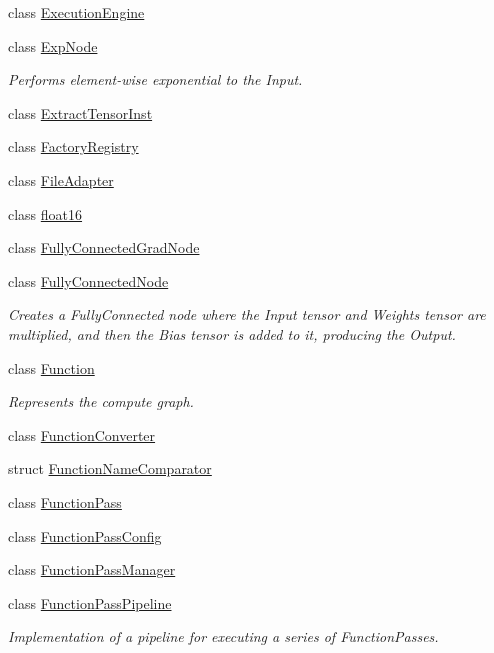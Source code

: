 \begin{DoxyCompactItemize}
\item 
class \hyperlink{classglow_1_1_execution_engine}{Execution\+Engine}
\item 
class \hyperlink{classglow_1_1_exp_node}{Exp\+Node}
\begin{DoxyCompactList}\small\item\em Performs element-\/wise exponential to the Input. \end{DoxyCompactList}\item 
class \hyperlink{classglow_1_1_extract_tensor_inst}{Extract\+Tensor\+Inst}
\item 
class \hyperlink{classglow_1_1_factory_registry}{Factory\+Registry}
\item 
class \hyperlink{classglow_1_1_file_adapter}{File\+Adapter}
\item 
class \hyperlink{classglow_1_1float16}{float16}
\item 
class \hyperlink{classglow_1_1_fully_connected_grad_node}{Fully\+Connected\+Grad\+Node}
\item 
class \hyperlink{classglow_1_1_fully_connected_node}{Fully\+Connected\+Node}
\begin{DoxyCompactList}\small\item\em Creates a Fully\+Connected node where the Input tensor and Weights tensor are multiplied, and then the Bias tensor is added to it, producing the Output. \end{DoxyCompactList}\item 
class \hyperlink{classglow_1_1_function}{Function}
\begin{DoxyCompactList}\small\item\em Represents the compute graph. \end{DoxyCompactList}\item 
class \hyperlink{classglow_1_1_function_converter}{Function\+Converter}
\item 
struct \hyperlink{structglow_1_1_function_name_comparator}{Function\+Name\+Comparator}
\item 
class \hyperlink{classglow_1_1_function_pass}{Function\+Pass}
\item 
class \hyperlink{classglow_1_1_function_pass_config}{Function\+Pass\+Config}
\item 
class \hyperlink{classglow_1_1_function_pass_manager}{Function\+Pass\+Manager}
\item 
class \hyperlink{classglow_1_1_function_pass_pipeline}{Function\+Pass\+Pipeline}
\begin{DoxyCompactList}\small\item\em Implementation of a pipeline for executing a series of Function\+Passes. \end{DoxyCompactList}\item 

\end{DoxyCompactItemize}
